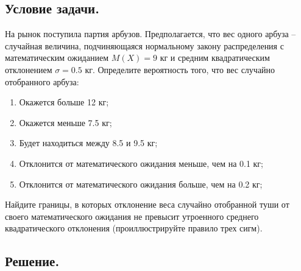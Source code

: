 \documentclass[a4paper, 12pt]{article}
\begin{document}
    \subsection{Условие задачи.}
    На рынок поступила партия арбузов. Предполагается, что вес одного 
    арбуза -- случайная величина, подчиняющаяся нормальному закону 
    распределения с математическим ожиданием $M(X) = 9$ кг и средним 
    квадратическим отклонением $\sigma = 0.5$ кг. Определите вероятность того, 
    что вес случайно отобранного арбуза:
    \begin{enumerate}
        \item Окажется больше 12 кг;
        \item Окажется меньше 7.5 кг;
        \item Будет находиться между 8.5 и 9.5 кг;
        \item Отклонится от математического ожидания меньше, чем на 0.1 кг;
        \item Отклонится от математического ожидания больше, чем на 0.2 кг;
    \end{enumerate}
    Найдите границы, в которых отклонение веса случайно отобранной 
    туши от своего математического ожидания не превысит утроенного среднего 
    квадратического отклонения (проиллюстрируйте правило трех сигм).


    \subsection{Решение.}
\end{document}
